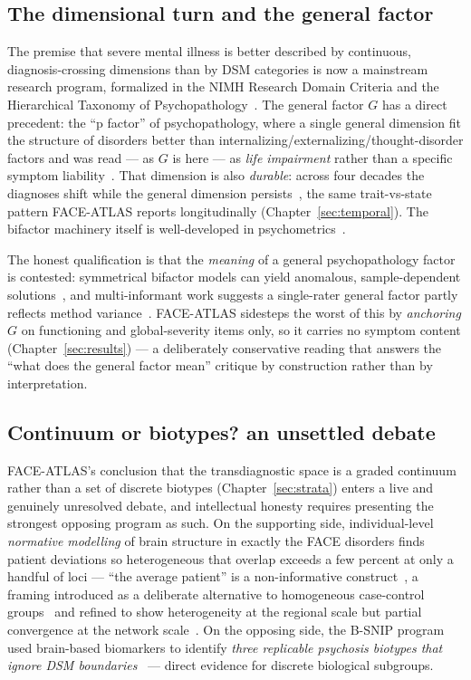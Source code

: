 \subsection{The dimensional turn and the general factor}
The premise that severe mental illness is better described by continuous, diagnosis-crossing dimensions than by
DSM categories is now a mainstream research program, formalized in the NIMH Research Domain Criteria and the
Hierarchical Taxonomy of Psychopathology~\cite{insel2010rdoc,kotov2017hitop}. The general factor $G$ has a
direct precedent: the ``p factor'' of psychopathology, where a single general dimension fit the structure of
disorders better than internalizing/externalizing/thought-disorder factors and was read --- as $G$ is here ---
as \emph{life impairment} rather than a specific symptom liability~\cite{caspi2014pfactor}. That dimension is
also \emph{durable}: across four decades the diagnoses shift while the general dimension persists~\cite{caspi2020dunedin},
the same trait-vs-state pattern FACE-ATLAS reports longitudinally (Chapter~\ref{sec:temporal}). The bifactor
machinery itself is well-developed in psychometrics~\cite{reise2012bifactor,lahey2017general}.

The honest qualification is that the \emph{meaning} of a general psychopathology factor is contested:
symmetrical bifactor models can yield anomalous, sample-dependent solutions~\cite{heinrich2021bifactor}, and
multi-informant work suggests a single-rater general factor partly reflects method variance~\cite{watts2021pfactor}.
FACE-ATLAS sidesteps the worst of this by \emph{anchoring} $G$ on functioning and global-severity items only,
so it carries no symptom content (Chapter~\ref{sec:results}) --- a deliberately conservative reading that
answers the ``what does the general factor mean'' critique by construction rather than by interpretation.

\subsection{Continuum or biotypes? an unsettled debate}
FACE-ATLAS's conclusion that the transdiagnostic space is a graded continuum rather than a set of discrete
biotypes (Chapter~\ref{sec:strata}) enters a live and genuinely unresolved debate, and intellectual honesty
requires presenting the strongest opposing program as such. On the supporting side, individual-level
\emph{normative modelling} of brain structure in exactly the FACE disorders finds patient deviations so
heterogeneous that overlap exceeds a few percent at only a handful of loci --- ``the average patient'' is a
non-informative construct~\cite{wolfers2018normative}, a framing introduced as a deliberate alternative to
homogeneous case-control groups~\cite{marquand2016normative} and refined to show heterogeneity at the regional
scale but partial convergence at the network scale~\cite{segal2023heterogeneity}. On the opposing side, the
B-SNIP program used brain-based biomarkers to identify \emph{three replicable psychosis biotypes that ignore
DSM boundaries}~\cite{clementz2016biotypes} --- direct evidence for discrete biological subgroups.

